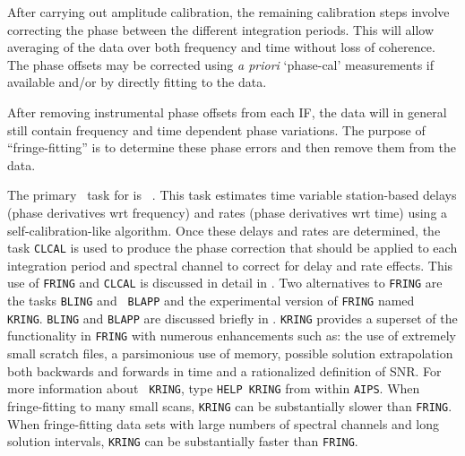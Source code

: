 
\vfill\eject
{}

After carrying out amplitude calibration, the remaining calibration
steps involve correcting the phase between the different integration periods.
This will allow averaging of the data over both frequency and time
without loss of coherence.  The phase offsets may be corrected using
{\it a priori\/} `phase-cal' measurements if available and/or by
directly fitting to the data.

After removing instrumental phase offsets from each IF, the data
will in general still contain frequency and time dependent phase
variations.  The purpose of ``fringe-fitting'' is to determine these
phase errors and then remove them from the data.

The primary \AIPS\ task for  is {\tt
{}}\@.  This task estimates time variable station-based
delays (phase derivatives wrt frequency) and rates (phase derivatives
wrt time) using a self-calibration-like algorithm.  Once these delays
and rates are determined, the task {\tt CLCAL} is used to produce the
phase correction that should be applied to each integration period and
spectral channel to correct for delay and rate effects.  This use of
{\tt FRING} and {\tt CLCAL} is discussed in detail in \@.
Two alternatives to {\tt FRING} are the tasks {\tt BLING} and {\tt
BLAPP} and the experimental version of {\tt FRING} named {\tt
KRING}\@.  {\tt BLING} and {\tt BLAPP} are discussed briefly in
\@.  {\tt KRING} provides a superset of the functionality
in {\tt FRING} with numerous enhancements such as: the use of
extremely small scratch files, a parsimonious use of memory, possible
solution extrapolation both backwards and forwards in time and a
rationalized definition of SNR\@.  For more information about {\tt
KRING}, type {\tt HELP KRING} from within {\tt AIPS}\@.  When
fringe-fitting to many small scans, {\tt KRING} can be substantially
slower than {\tt FRING}\@.  When fringe-fitting data sets with large
numbers of spectral channels and long solution intervals, {\tt KRING}
can be substantially faster than {\tt FRING}\@.


